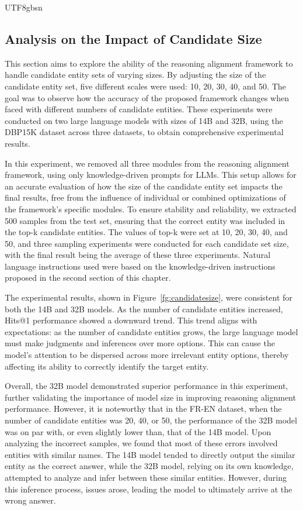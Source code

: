 \documentclass[preprint,12pt]{elsarticle}
\begin{document}
\begin{CJK}{UTF8}{gbsn}
\subsection{Analysis on the Impact of Candidate Size}

This section aims to explore the ability of the reasoning alignment framework to handle candidate entity sets of varying sizes. By adjusting the size of the candidate entity set, five different scales were used: 10, 20, 30, 40, and 50. The goal was to observe how the accuracy of the proposed framework changes when faced with different numbers of candidate entities. These experiments were conducted on two large language models with sizes of 14B and 32B, using the DBP15K dataset across three datasets, to obtain comprehensive experimental results.

In this experiment, we removed all three modules from the reasoning alignment framework, using only knowledge-driven prompts for LLMs. This setup allows for an accurate evaluation of how the size of the candidate entity set impacts the final results, free from the influence of individual or combined optimizations of the framework's specific modules. To ensure stability and reliability, we extracted 500 samples from the test set, ensuring that the correct entity was included in the top-k candidate entities. The values of top-k were set at 10, 20, 30, 40, and 50, and three sampling experiments were conducted for each candidate set size, with the final result being the average of these three experiments. Natural language instructions used were based on the knowledge-driven instructions proposed in the second section of this chapter.

The experimental results, shown in Figure~\ref{fg:candidatesize}, were consistent for both the 14B and 32B models. As the number of candidate entities increased, Hits@1 performance showed a downward trend. This trend aligns with expectations: as the number of candidate entities grows, the large language model must make judgments and inferences over more options. This can cause the model's attention to be dispersed across more irrelevant entity options, thereby affecting its ability to correctly identify the target entity.

Overall, the 32B model demonstrated superior performance in this experiment, further validating the importance of model size in improving reasoning alignment performance. However, it is noteworthy that in the FR-EN dataset, when the number of candidate entities was 20, 40, or 50, the performance of the 32B model was on par with, or even slightly lower than, that of the 14B model. Upon analyzing the incorrect samples, we found that most of these errors involved entities with similar names. The 14B model tended to directly output the similar entity as the correct answer, while the 32B model, relying on its own knowledge, attempted to analyze and infer between these similar entities. However, during this inference process, issues arose, leading the model to ultimately arrive at the wrong answer.



\end{CJK}
\end{document}

